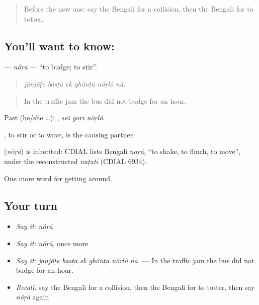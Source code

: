 \label{lesson:BN-C391-nora}



\begin{quote}
Before the new one: say the Bengali for a collision, then the Bengali for to totter.
\end{quote}

\subsection*{You'll want to know: }
\textbf{} — \emph{nôṛā} — \textquotedblleft{}to budge; to stir\textquotedblright{}.

\begin{quote}
     
\end{quote}

\begin{quote}
\emph{jānjôṭe bāsṭā ek ghônṭā nôṛlô nā.}
\end{quote}

\begin{quote}
In the traffic jam the bus did not budge for an hour.
\end{quote}

Past (he/she …):   , \emph{sei gāṛi nôṛlô}.

, to stir or to wave, is the causing partner.

\begin{cousinweb}
\textbf{} (\emph{nôṛā}) is inherited: CDIAL lists Bengali \emph{naṛā}, \textquotedblleft{}to shake, to flinch, to move\textquotedblright{}, under the reconstructed \emph{naṭati} (CDIAL 6934).
\end{cousinweb}

\begin{grammarlens}[title={What you've built}]
One more word for getting around.
\end{grammarlens}

\subsection*{Your turn}
\begin{itemize}
\raggedright
  \item \emph{Say it:} \emph{nôṛā}
  \item \emph{Say it:} \emph{nôṛā}, once more
  \item \emph{Say it:} \emph{jānjôṭe bāsṭā ek ghônṭā nôṛlô nā.} — In the traffic jam the bus did not budge for an hour.
  \item \emph{Recall:} say the Bengali for a collision, then the Bengali for to totter, then say \emph{nôṛā} again
\end{itemize}

